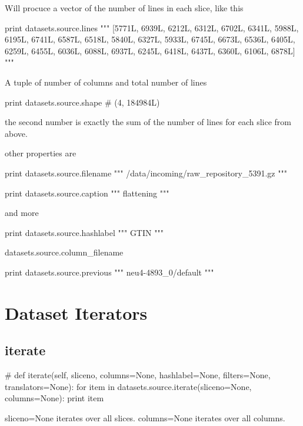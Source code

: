Will procuce a vector of the number of lines in each slice, like this

\begin{python}
  print datasets.source.lines
  """
[5771L, 6939L, 6212L, 6312L, 6702L, 6341L, 5988L, 6195L,
 6741L, 6587L, 6518L, 5840L, 6327L, 5933L, 6745L, 6673L,
 6536L, 6405L, 6259L, 6455L, 6036L, 6088L, 6937L, 6245L,
 6418L, 6437L, 6360L, 6106L, 6878L]
"""
\end{python}

A tuple of number of columns and total number of lines

\begin{python}
  print datasets.source.shape
  # (4, 184984L)
\end{python}
the second number is exactly the sum of the number of lines for each
slice from above.

other properties are

\begin{python}
  print datasets.source.filename
  """
/data/incoming/raw_repository_5391.gz
"""
\end{python}

\begin{python}
  print datasets.source.caption
  """
flattening
"""
\end{python}


and more

\begin{python}
  print datasets.source.hashlabel
  """
GTIN
"""
\end{python}
\begin{python}
datasets.source.column\_filename
\end{python}

\begin{python}
  print datasets.source.previous
  """
neu4-4893_0/default
"""
\end{python}




\section{Dataset Iterators}

\subsection{iterate}
\begin{python}
# def iterate(self, sliceno, columns=None, hashlabel=None, filters=None, translators=None):
  for item in datasets.source.iterate(sliceno=None, columns=None):
    print item
\end{python}
sliceno=None iterates over all slices.
columns=None iterates over all columns.

